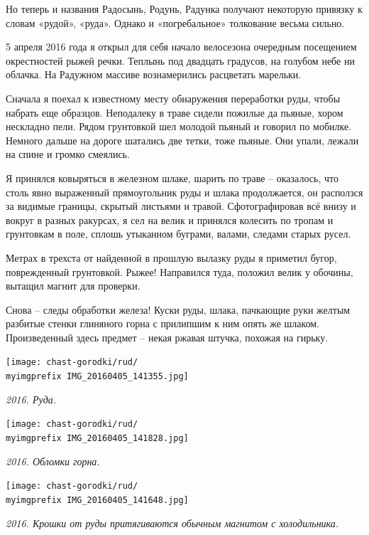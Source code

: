 Но теперь и названия Радосынь, Родунь, Радунка получают некоторую привязку к словам «рудой», «руда». Однако и «погребальное» толкование весьма сильно.

5 апреля 2016 года я открыл для себя начало велосезона очередным посещением окрестностей рыжей речки. Теплынь под двадцать градусов, на голубом небе ни облачка. На Радужном массиве вознамерились расцветать марельки.

Сначала я поехал к известному месту обнаружения переработки руды, чтобы набрать еще образцов. Неподалеку в траве сидели пожилые да пьяные, хором нескладно пели. Рядом грунтовкой шел молодой пьяный и говорил по мобилке. Немного дальше на дороге шатались две тетки, тоже пьяные. Они упали, лежали на спине и громко смеялись.

Я принялся ковыряться в железном шлаке, шарить по траве – оказалось, что столь явно выраженный прямоугольник руды и шлака продолжается, он расползся за видимые границы, скрытый листьями и травой. Сфотографировав всё внизу и вокруг в разных ракурсах, я сел на велик и принялся колесить по тропам и грунтовкам в поле, сплошь утыканном буграми, валами, следами старых русел.

Метрах в трехста от найденной в прошлую вылазку руды я приметил бугор, поврежденный грунтовкой. Рыжее! Направился туда, положил велик у обочины, вытащил магнит для проверки.

Снова – следы обработки железа! Куски руды, шлака, пачкающие руки желтым разбитые стенки глиняного горна с прилипшим к ним опять же шлаком. Произведенный здесь предмет – некая ржавая штучка, похожая на гирьку.
\vspace*{\fill}
\begin{center}
\texttt{[image: chast-gorodki/rud/\\myimgprefix IMG\_20160405\_141355.jpg]}

\textit{2016. Руда.}
\end{center}
\vspace*{\fill}
\newpage

\begin{center}
\texttt{[image: chast-gorodki/rud/\\myimgprefix IMG\_20160405\_141828.jpg]}

\textit{2016. Обломки горна.}
\end{center}


\begin{center}
\texttt{[image: chast-gorodki/rud/\\myimgprefix IMG\_20160405\_141648.jpg]}

\textit{2016. Крошки от руды притягиваются обычным магнитом с холодильника.}
\end{center}

